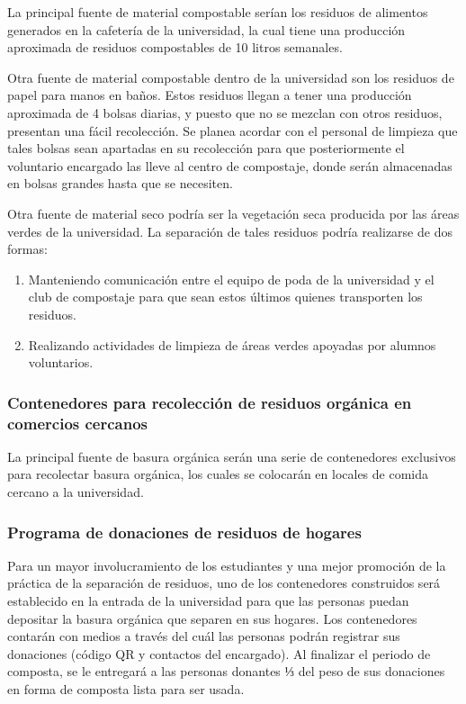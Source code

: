 La principal fuente de material compostable serían los residuos de alimentos generados en la cafetería de la universidad, la cual tiene una producción aproximada de residuos compostables de 10 litros semanales.

Otra fuente de material compostable dentro de la universidad son los residuos de papel para manos en baños. Estos residuos llegan a tener una producción aproximada de 4 bolsas diarias, y puesto que no se mezclan con otros residuos, presentan una fácil recolección. Se planea acordar con el personal de limpieza que tales bolsas sean apartadas en su recolección para que posteriormente el voluntario encargado las lleve al centro de compostaje, donde serán almacenadas en bolsas grandes hasta que se necesiten.

Otra fuente de material seco podría ser la vegetación seca producida por las áreas verdes de la universidad. La separación de tales residuos podría realizarse de dos formas:

\begin{enumerate}
    \item Manteniendo comunicación entre el equipo de poda de la universidad y el club de compostaje para que sean estos últimos quienes transporten los residuos.
    \item Realizando actividades de limpieza de áreas verdes apoyadas por alumnos voluntarios.
\end{enumerate}


\subsubsection{Contenedores para recolección de residuos orgánica en comercios cercanos}

La principal fuente de basura orgánica serán una serie de contenedores exclusivos para recolectar basura orgánica, los cuales se colocarán en locales de comida cercano a la universidad.

%    
    
\subsubsection{Programa de donaciones de residuos de hogares}

Para un mayor involucramiento de los estudiantes y una mejor promoción de la práctica de la separación de residuos, uno de los contenedores construidos será establecido en la entrada de la universidad para que las personas puedan depositar la basura orgánica que separen en sus hogares. Los contenedores contarán con medios a través del cuál las personas podrán registrar sus donaciones (código QR y contactos del encargado). Al finalizar el periodo de composta, se le entregará a las personas donantes ⅓ del peso de sus donaciones en forma de composta lista para ser usada.

